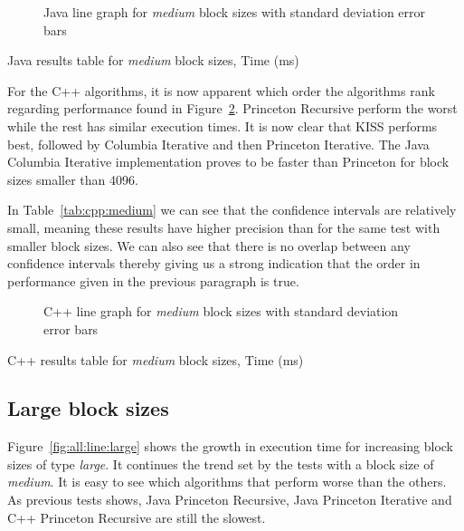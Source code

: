 \ifrelease
\begin{figure}
    \centering
    
    \caption{Java line graph for \emph{medium} block sizes with standard deviation error bars}
    \label{fig:java:line:medium}
\end{figure}
\fi

\ifrelease
\begin{table}
    \centering
    \caption{Java results table for \emph{medium} block sizes, Time (ms)}
    \label{tab:java:medium}
    
\end{table}
\fi

For the C++ algorithms, it is now apparent which order the algorithms rank regarding performance found in Figure~\ref{fig:cpp:line:medium}. Princeton Recursive perform the worst while the rest has similar execution times. It is now clear that KISS performs best, followed by Columbia Iterative and then Princeton Iterative. The Java Columbia Iterative implementation proves to be faster than Princeton for block sizes smaller than 4096.

In Table~\ref{tab:cpp:medium} we can see that the confidence intervals are relatively small, meaning these results have higher precision than for the same test with smaller block sizes. We can also see that there is no overlap between any confidence intervals thereby giving us a strong indication that the order in performance given in the previous paragraph is true.

\ifrelease
\begin{figure}
    \centering
    
    \caption{C++ line graph for \emph{medium} block sizes with standard deviation error bars}
    \label{fig:cpp:line:medium}
\end{figure}
\fi

\ifrelease
\begin{table}
    \centering
    \caption{C++ results table for \emph{medium} block sizes, Time (ms)}
    \label{tab:cpp:medium}
    \resizebox{\columnwidth}{!}{%
        
    }
\end{table}
\fi

\subsection{Large block sizes}
Figure~\ref{fig:all:line:large} shows the growth in execution time for increasing block sizes of type \emph{large}. It continues the trend set by the tests with a block size of \emph{medium}. It is easy to see which algorithms that perform worse than the others. As previous tests shows, Java Princeton Recursive, Java Princeton Iterative and C++ Princeton Recursive are still the slowest.

